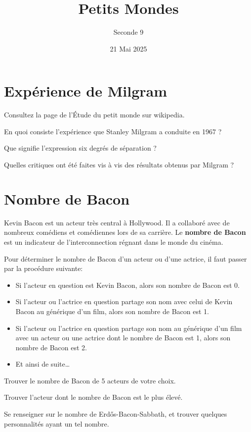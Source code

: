 \documentclass{article}
\title{Petits Mondes}
\date{21 Mai 2025}
\author{Seconde 9}
\begin{document}
\maketitle
\section{Expérience de Milgram}
Consultez la page de l'Étude du petit monde sur wikipedia.

\begin{enumquestions}
\item En quoi consiste l'expérience que Stanley Milgram a conduite en 1967 ?
\item Que signifie l'expression \og six degrés de séparation \fg ?
\item Quelles critiques ont été faites vis à vis des résultats obtenus par Milgram ?
\end{enumquestions}

\vspace*{0.5cm}
\emptybox{6cm}
\section{Nombre de Bacon}
Kevin Bacon est un acteur très central à Hollywood. Il a collaboré avec de nombreux comédiens et comédiennes lors de sa carrière. Le \textbf{nombre de Bacon} est un indicateur de l'interconnection régnant dans le monde du cinéma.

Pour déterminer le nombre de Bacon d'un acteur ou d'une actrice, il faut passer par la procédure suivante:
\begin{itemize}
\item Si l'acteur en question est Kevin Bacon, alors son nombre de Bacon est 0.
\item Si l'acteur ou l'actrice en question partage son nom avec celui de Kevin Bacon au générique d'un film, alors son nombre de Bacon est 1.
\item Si l'acteur ou l'actrice en question partage son nom au générique d'un film avec un acteur ou une actrice dont le nombre de Bacon est 1, alors son nombre de Bacon est 2.
\item Et ainsi de suite\dots
\end{itemize}
\begin{enumquestions}
\item Trouver le nombre de Bacon de 5 acteurs de votre choix.
\item Trouver l'acteur dont le nombre de Bacon est le plus élevé.
\item Se renseigner sur le nombre de Erdős-Bacon-Sabbath, et trouver quelques personnalités ayant un tel nombre.
\end{enumquestions}
\end{document}
